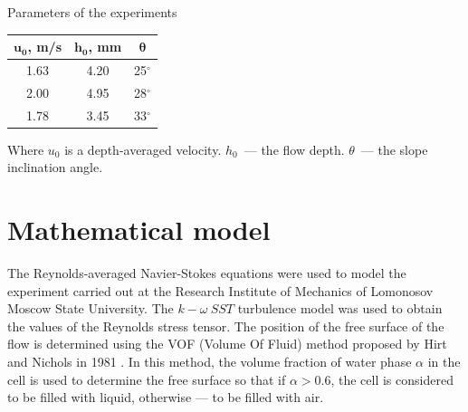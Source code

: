 \documentclass[applsci,article,submit,moreauthors,pdftex]{Definitions/mdpi}
\begin{document}
\begin{specialtable}[H]
    \centering
	\caption{Parameters of the experiments\label{tabNIIMexLinear}}
	\begin{tabular}{  c  c  c  }
	\toprule
	\textbf{$\boldsymbol{u_0}$, m/s}	& \textbf{$\boldsymbol{h_0}$, mm}	& \textbf{$\boldsymbol{\theta}$}\\
	\midrule
	1.63 & 4.20 & 25$^\circ$\\
	2.00 & 4.95 & 28$^\circ$\\
	1.78 & 3.45 & 33$^\circ$\\
	\bottomrule
	\end{tabular}
\end{specialtable}

Where $u_0$ is a depth-averaged velocity. $h_0$~--- the flow depth. $\theta$~--- the slope inclination angle.



\section{Mathematical model}\label{math_model}

The Reynolds-averaged Navier-Stokes equations were used to model the experiment carried out at the Research Institute of Mechanics of Lomonosov Moscow State University. The $k-\omega\ SST$ turbulence model was used to obtain the values of the Reynolds stress tensor. The position of the free surface of the flow is determined using the VOF (Volume Of Fluid) method proposed by Hirt and Nichols in 1981 \cite{HirtNichols1981}. In this method, the volume fraction of water phase $\alpha$ in the cell is used to determine the free surface so that if $\alpha>0.6$, the cell is considered to be filled with liquid, otherwise --- to be filled with air.
\end{document}
